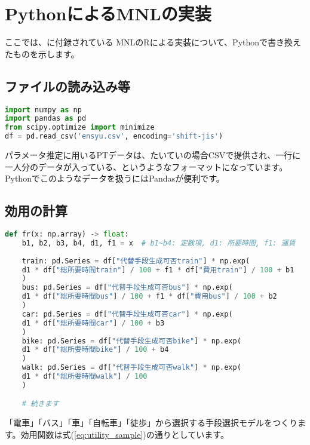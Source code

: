 \chapter{PythonによるMNLの実装}\label{code}

ここでは、\cite{binn}に付録されている MNLのRによる実装について、Pythonで書き換えたものを示します。

\section{ファイルの読み込み等}

\begin{lstlisting}[language=Python]
import numpy as np
import pandas as pd
from scipy.optimize import minimize
df = pd.read_csv('ensyu.csv', encoding='shift-jis')
\end{lstlisting}

パラメータ推定に用いるPTデータは、たいていの場合CSVで提供され、一行に一人分のデータが入っている、というようなフォーマットになっています。Pythonでこのようなデータを扱うにはPandasが便利です。

\section{効用の計算}

\begin{lstlisting}[language=Python]
def fr(x: np.array) -> float:
    b1, b2, b3, b4, d1, f1 = x  # b1~b4: 定数項, d1: 所要時間, f1: 運賃
    
    train: pd.Series = df["代替手段生成可否train"] * np.exp(
    d1 * df["総所要時間train"] / 100 + f1 * df["費用train"] / 100 + b1
    )
    bus: pd.Series = df["代替手段生成可否bus"] * np.exp(
    d1 * df["総所要時間bus"] / 100 + f1 * df["費用bus"] / 100 + b2
    )
    car: pd.Series = df["代替手段生成可否car"] * np.exp(
    d1 * df["総所要時間car"] / 100 + b3
    )
    bike: pd.Series = df["代替手段生成可否bike"] * np.exp(
    d1 * df["総所要時間bike"] / 100 + b4
    )
    walk: pd.Series = df["代替手段生成可否walk"] * np.exp(
    d1 * df["総所要時間walk"] / 100
    )

    # 続きます
\end{lstlisting}

「電車」「バス」「車」「自転車」「徒歩」から選択する手段選択モデルをつくります。効用関数は式(\ref{eq:utility_sample})の通りとしています。

